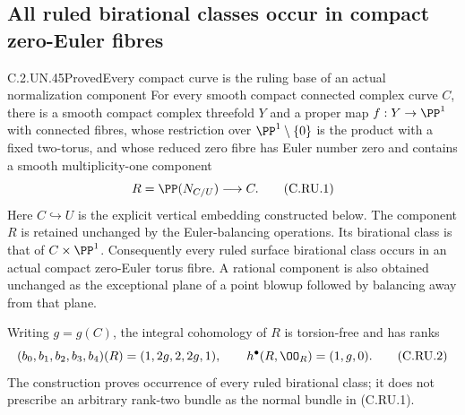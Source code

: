 \subsection{All ruled birational classes occur in compact zero-Euler fibres}

\begin{statement}{C.2.UN.45}{Proved}{Every compact curve is the ruling base of an actual normalization component}
For every smooth compact connected complex curve $C$, there is a smooth
compact complex threefold $Y$ and a proper map $f:Y\to\PP^1$ with connected
fibres, whose restriction over $\PP^1\setminus\{0\}$ is the product with a
fixed two-torus, and whose reduced zero fibre has Euler number zero and
contains a smooth multiplicity-one component
\[
                         R=\PP(N_{C/U})\longrightarrow C.
\tag{C.RU.1}
\]
Here $C\hookrightarrow U$ is the explicit vertical embedding constructed
below. The component $R$ is retained unchanged by the Euler-balancing
operations. Its birational class is that of $C\times\PP^1$.
Consequently every ruled surface birational class occurs in an actual
compact zero-Euler torus fibre. A rational component is also obtained
unchanged as the exceptional plane of a point blowup followed by balancing
away from that plane.

Writing $g=g(C)$, the integral cohomology of $R$ is torsion-free and has ranks
\[
              (b_0,b_1,b_2,b_3,b_4)(R)=(1,2g,2,2g,1),
              \qquad h^\bullet(R,\OO_R)=(1,g,0).
\tag{C.RU.2}
\]
The construction proves occurrence of every ruled birational class; it
does not prescribe an arbitrary rank-two bundle as the normal bundle in
(C.RU.1).
\end{statement}

